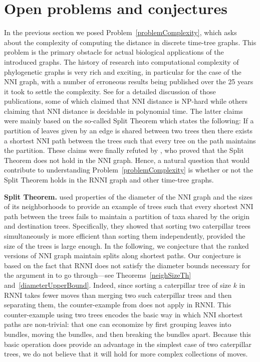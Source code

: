 \documentclass[11pt]{amsart}
\theoremstyle{definition}
\newcommand{\nni}{\mathrm{NNI}}
\newcommand{\rnni}{\mathrm{RNNI}}
\begin{document}
\section{Open problems and conjectures}

In the previous section we posed Problem~\ref{problemComplexity}, which asks about the complexity of computing the distance in discrete time-tree graphs.
This problem is the primary obstacle for actual biological applications of the introduced graphs.
The history of research into computational complexity of phylogenetic graphs is very rich and exciting, in particular for the case of the $\nni$ graph, with a number of erroneous results being published over the 25 years it took to settle the complexity.
See \autocite{Dasgupta2000-xa} for a detailed discussion of those publications, some of which claimed that $\nni$ distance is NP-hard while others claiming that $\nni$ distance is decidable in polynomial time.
The latter claims were mainly based on the so-called Split Theorem which states the following:
If a partition of leaves given by an edge is shared between two trees then there exists a shortest $\nni$ path between the trees such that every tree on the path maintains the partition.
These claims were finally refuted by \textcite{li1996some}, who proved that the Split Theorem does not hold in the $\nni$ graph.
Hence, a natural question that would contribute to understanding Problem~\ref{problemComplexity} is whether or not the Split Theorem holds in the $\rnni$ graph and other time-tree graphs.

\textbf{Split Theorem.} \textcite{li1996some} used properties of the diameter of the $\nni$ graph and the sizes of its neighborhoods to provide an example of trees such that every shortest $\nni$ path between the trees fails to maintain a partition of taxa shared by the origin and destination trees.
Specifically, they showed that sorting two caterpillar trees simultaneously is more efficient than sorting them independently, provided the size of the trees is large enough.
In the following, we conjecture that the ranked versions of $\nni$ graph maintain splits along shortest paths.
Our conjecture is based on the fact that $\rnni$ does not satisfy the diameter bounds necessary for the argument in \autocite{li1996some} to go through---see Theorems~\ref{neighSizeTh} and~\ref{diameterUpperBound}.
Indeed, since sorting a caterpillar tree of size $k$ in $\rnni$ takes fewer moves than merging two such caterpillar trees and then separating them, the counter-example from \autocite{li1996some} does not apply in $\rnni$.
This counter-example using two trees encodes the basic way in which $\nni$ shortest paths are non-trivial: that one can economize by first grouping leaves into bundles, moving the bundles, and then breaking the bundles apart.
Because this basic operation does provide an advantage in the simplest case of two caterpillar trees, we do not believe that it will hold for more complex collections of moves.
\end{document}
